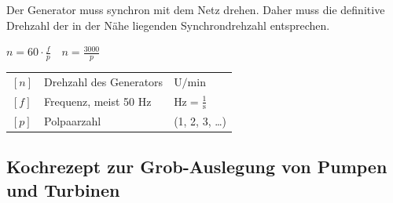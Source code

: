Der Generator muss synchron mit dem Netz drehen. Daher muss die definitive Drehzahl der in der Nähe liegenden Synchrondrehzahl entsprechen.

\vspace{0.15cm}

$
\boxed{n = 60 \cdot \frac{f}{p} } \quad \boxed{n = \frac{3000}{p}}
$

\vspace{0.15cm}

\renewcommand{\arraystretch}{1.2}
\begin{tabular}{@{} l p{6cm} l @{}}
    $[n]$           & Drehzahl des Generators \dotfill                         & $\text{U/min}$ \\
    $[f]$           & Frequenz, meist 50 Hz \dotfill                            & $\text{Hz} = \frac{1}{\text{s}}$ \\
    $[p]$           & Polpaarzahl \dotfill                                      & (1, 2, 3, \dots) \\
\end{tabular}


\subsection{Kochrezept zur Grob-Auslegung von Pumpen und Turbinen}

